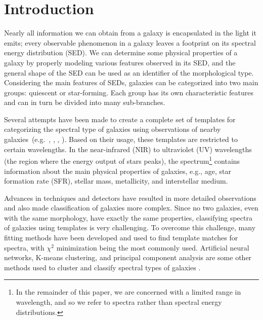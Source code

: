 \section{Introduction}
\label{sec: intro_somz}
Nearly all information we can obtain from a galaxy is encapsulated in the light it emits; every observable phenomenon in a galaxy leaves a footprint on its spectral energy distribution (SED).
We can determine some physical properties of a galaxy by properly modeling various features observed in its SED, and the general shape of the SED can be used as an identifier of the morphological type.
Considering the main features of SEDs, galaxies can be categorized into two main groups: quiescent or star-forming.
Each group has its own characteristic features and can in turn be divided into many sub-branches.

Several attempts have been made to create a complete set of templates for categorizing the spectral type of galaxies using observations of nearby galaxies~(e.g.~\citealt{Kinney93}, \citealt[][hereafter ]{Kinney96}, \citealt{Bershady00}, \citealt{Mannucci01}). 
Based on their usage, these templates are restricted to certain wavelengths.
In the near-infrared (NIR) to ultraviolet (UV) wavelengths (the region where the energy output of stars peaks), the spectrum\footnote{In the remainder of this paper, we are concerned with a limited range in wavelength, and so we refer to spectra rather than spectral energy distributions.} contains information about the main physical properties of galaxies, e.g., age, star formation rate (SFR), stellar mass, metallicity, and interstellar medium. 



Advances in techniques and detectors have resulted in more detailed observations and also made classification of galaxies more complex.
Since no two galaxies, even with the same morphology, have exactly the same properties, classifying spectra of galaxies using templates is very challenging.
To overcome this challenge, many fitting methods have been developed and used to find template matches for spectra, with $\chi^2$ minimization being the most commonly used. 
Artificial neural networks, K-means clustering, and principal component analysis are some other methods used to cluster and classify spectral types of galaxies \citep[e.g.][]{Allen13,Ordov14,Shi15}.


